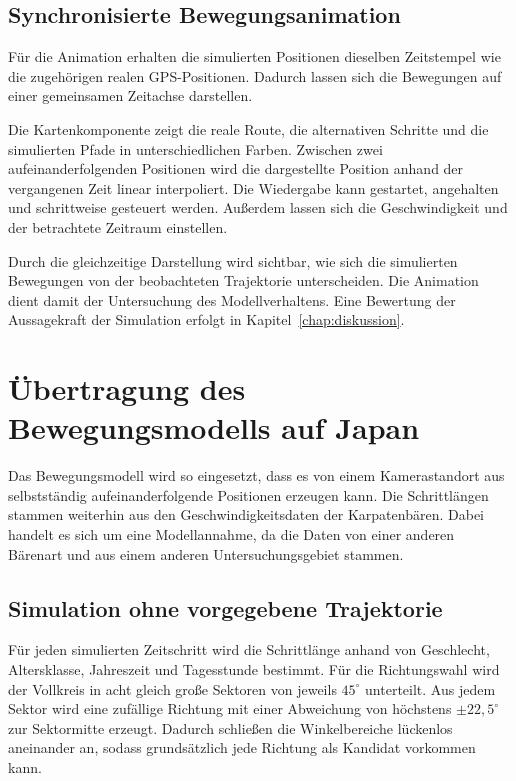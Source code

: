 \documentclass[12pt,a4paper]{report}
\begin{document}
\subsection{Synchronisierte Bewegungsanimation}
\label{subsec:synchron}

Für die Animation erhalten die simulierten Positionen
dieselben Zeitstempel wie die zugehörigen realen
GPS-Positionen. Dadurch lassen sich die Bewegungen
auf einer gemeinsamen Zeitachse darstellen.

Die Kartenkomponente zeigt die reale Route, die
alternativen Schritte und die simulierten Pfade in
unterschiedlichen Farben. Zwischen zwei aufeinanderfolgenden
Positionen wird die dargestellte Position anhand der
vergangenen Zeit linear interpoliert. Die Wiedergabe
kann gestartet, angehalten und schrittweise gesteuert
werden. Außerdem lassen sich die Geschwindigkeit
und der betrachtete Zeitraum einstellen.

Durch die gleichzeitige Darstellung wird sichtbar,
wie sich die simulierten Bewegungen von der
beobachteten Trajektorie unterscheiden. Die Animation
dient damit der Untersuchung des Modellverhaltens.
Eine Bewertung der Aussagekraft der Simulation
erfolgt in Kapitel~\ref{chap:diskussion}.


\section{Übertragung des Bewegungsmodells auf Japan}
\label{sec:japan-uebertragung}

Das Bewegungsmodell wird so eingesetzt,
dass es von einem Kamerastandort aus selbstständig aufeinanderfolgende
Positionen erzeugen kann. Die Schrittlängen stammen weiterhin aus den
Geschwindigkeitsdaten der Karpatenbären. Dabei handelt es sich um eine
Modellannahme, da die Daten von einer anderen Bärenart und aus einem
anderen Untersuchungsgebiet stammen.

\subsection{Simulation ohne vorgegebene Trajektorie}

Für jeden simulierten Zeitschritt wird die Schrittlänge anhand von
Geschlecht, Altersklasse, Jahreszeit und Tagesstunde bestimmt.
Für die Richtungswahl wird der Vollkreis in acht gleich große
Sektoren von jeweils $45^\circ$ unterteilt. Aus jedem Sektor
wird eine zufällige Richtung mit einer Abweichung von
höchstens $\pm 22{,}5^\circ$ zur Sektormitte erzeugt.
Dadurch schließen die Winkelbereiche lückenlos aneinander an,
sodass grundsätzlich jede Richtung als Kandidat vorkommen kann.
\end{document}
